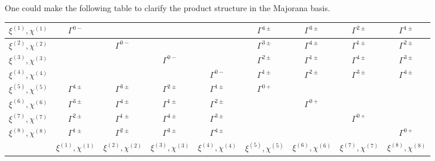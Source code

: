 One could make the following table to clarify the product structure
in the Majorana basis.
\begin{table}[ht]
\begin{tabular}{|c|c|c|c|c|c|c|c|c|}
\hline
$\xi^{(1)},\chi^{(1)}$ & $\Gamma^{0-}$        &                        &                        &                        & $\Gamma^{4\pm}$        & $\Gamma^{3\pm}$        & $\Gamma^{2\pm}$        & $\Gamma^{1\pm}$        \\ \hline
$\xi^{(2)},\chi^{(2)}$ &                        & $\Gamma^{0-}$        &                        &                        & $\Gamma^{3\pm}$        & $\Gamma^{4\pm}$        & $\Gamma^{1\pm}$        & $\Gamma^{2\pm}$        \\ \hline
$\xi^{(3)},\chi^{(3)}$ &                        &                        & $\Gamma^{0-}$        &                        & $\Gamma^{2\pm}$        & $\Gamma^{1\pm}$        & $\Gamma^{4\pm}$        & $\Gamma^{3\pm}$        \\ \hline
$\xi^{(4)},\chi^{(4)}$ &                        &                        &                        & $\Gamma^{0-}$        & $\Gamma^{1\pm}$        & $\Gamma^{2\pm}$        & $\Gamma^{3\pm}$        & $\Gamma^{4\pm}$        \\ \hline
$\xi^{(5)},\chi^{(5)}$ & $\Gamma^{4\pm}$        & $\Gamma^{3\pm}$        & $\Gamma^{2\pm}$        & $\Gamma^{1\pm}$        & $\Gamma^{0+}$        &                        &                        &                        \\ \hline
$\xi^{(6)},\chi^{(6)}$ & $\Gamma^{3\pm}$        & $\Gamma^{4\pm}$        & $\Gamma^{1\pm}$        & $\Gamma^{2\pm}$        &                        & $\Gamma^{0+}$        &                        &                        \\ \hline
$\xi^{(7)},\chi^{(7)}$ & $\Gamma^{2\pm}$        & $\Gamma^{1\pm}$        & $\Gamma^{4\pm}$        & $\Gamma^{3\pm}$        &                        &                        & $\Gamma^{0+}$        &                        \\ \hline
$\xi^{(8)},\chi^{(8)}$ & $\Gamma^{1\pm}$        & $\Gamma^{2\pm}$        & $\Gamma^{3\pm}$        & $\Gamma^{4\pm}$        &                        &                        &                        & $\Gamma^{0+}$        \\ \hline
                       & $\xi^{(1)},\chi^{(1)}$ & $\xi^{(2)},\chi^{(2)}$ & $\xi^{(3)},\chi^{(3)}$ & $\xi^{(4)},\chi^{(4)}$ & $\xi^{(5)},\chi^{(5)}$ & $\xi^{(6)},\chi^{(6)}$ & $\xi^{(7)},\chi^{(7)}$ & $\xi^{(8)},\chi^{(8)}$ \\ \hline
\end{tabular}
\end{table}

